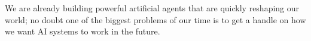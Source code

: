 
We are already building powerful artificial agents that are quickly reshaping our world; no doubt one of the biggest problems of our time is to get a handle on how we want AI systems to work in the future.  
